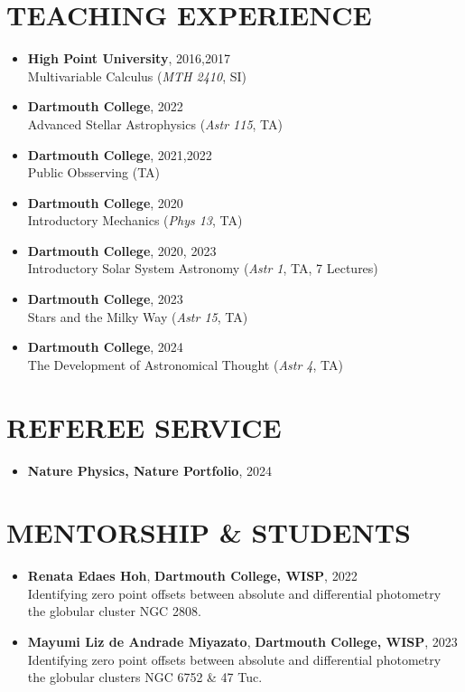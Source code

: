 \documentclass[margin, 10pt]{res} %
\begin{document}
\begin{resume}
\section{TEACHING EXPERIENCE}
\begin{itemize}
	\item {\scriptsize \textbf{High Point University}}, {\small 2016,2017} \\ Multivariable Calculus (\textit{MTH 2410}, SI)
	\item {\scriptsize \textbf{Dartmouth College}}, {\small 2022} \\ Advanced Stellar Astrophysics (\textit{Astr 115}, TA)
	\item {\scriptsize \textbf{Dartmouth College}}, {\small 2021,2022} \\ Public Obsserving (TA)
	\item {\scriptsize \textbf{Dartmouth College}}, {\small 2020} \\ Introductory Mechanics (\textit{Phys 13}, TA)
	\item {\scriptsize \textbf{Dartmouth College}}, {\small 2020, 2023} \\ Introductory Solar System Astronomy (\textit{Astr 1}, TA, 7 Lectures)
	\item {\scriptsize \textbf{Dartmouth College}}, {\small 2023} \\ Stars and the Milky Way (\textit{Astr 15}, TA)
	\item {\scriptsize \textbf{Dartmouth College}}, {\small 2024} \\ The Development of Astronomical Thought (\textit{Astr 4}, TA)
\end{itemize}

\section{REFEREE SERVICE}
\begin{itemize}
  \item {\scriptsize \textbf{Nature Physics, Nature Portfolio}}, {\small 2024}
\end{itemize}

\section{MENTORSHIP \& STUDENTS}
\begin{itemize}
	\item \textbf{Renata Edaes Hoh}, {\scriptsize \textbf{Dartmouth College, WISP}}, {\small 2022} \\ Identifying zero point offsets between absolute and differential photometry the globular cluster NGC 2808.
	\item \textbf{Mayumi Liz de Andrade Miyazato}, {\scriptsize \textbf{Dartmouth College, WISP}}, {\small 2023} \\ Identifying zero point offsets between absolute and differential photometry the globular clusters NGC 6752 \& 47 Tuc.
\end{itemize}



\end{resume}
\end{document}
